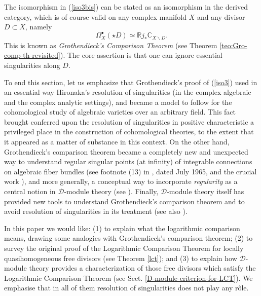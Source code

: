 \documentclass[12pt]{article}
\newcommand{\CC}{\mathbb{C}}
\newcommand{\RR}{\mathbb{R}}
\newcommand{\DD}{\mathcal{D}}
\newcommand\bu{\bullet}
\newcommand\ssm{\smallsetminus}
\newcommand\beq{\begin{equation}}
\newcommand\eeq{\end{equation}}
\begin{document}
The isomorphism in (\ref{iso3bis}) can be stated as an isomorphism in the derived category, which is of course valid on any complex manifold $X$ and any divisor $D\subset X$, namely
\beq\label{iso3}{\Omega}^\bu_X(\star D)\simeq \RR j_*\CC_{X\ssm D}.\eeq
This is known as
{\it Grothendieck's Comparison Theorem} (see Theorem \ref{teo:Gro-comp-th-revisited}). The core assertion is that one can ignore essential singularities along $D$.

To end this section, let us emphasize that Grothendieck's proof of (\ref{iso3}) used in an essential way Hironaka's resolution of singularities (in the complex algebraic and the complex analytic settings), and became a model to follow for the cohomological study of algebraic varieties over an arbitrary field. This fact brought conferred upon the resolution of singularities in positive characteristic a privileged place in the construction of cohomological theories, to the extent that it appeared as a matter of substance in this context.
On the other hand, Grothendieck's comparison theorem became a completely new and unexpected way to understand regular singular points (at infinity) of integrable connections on algebraic fiber bundles (see footnote (13) in \cite{GRO}, dated July 1965, and the crucial work \cite{deligne-LNM}), and more generally, a conceptual way to incorporate {\em regularity} as a central notion in $\DD$-module theory (see \cite{meb_1980}).
%
Finally, $\DD$-module theory itself has provided new tools to understand Grothendieck's comparison theorem and to avoid resolution of singularities in its treatment \cite{meb_IHES, meb_1990} (see also \cite{meb_CIMPA_96}).
%

In this paper we would like: (1) to explain what the logarithmic comparison means, drawing some analogies with Grothendieck's comparison theorem; (2) to survey the original proof of the Logarithmic Comparison Theorem for locally quasihomogeneous free divisors (see Theorem \ref{lct}); and (3) to explain how $\DD$-module theory provides a characterization of those free divisors which satisfy the Logarithmic Comparison Theorem (see Sect. \ref{D-module-criterion-for-LCT}). We emphasise that in all of them resolution of singularities does not play any r\^ole.
\end{document}
